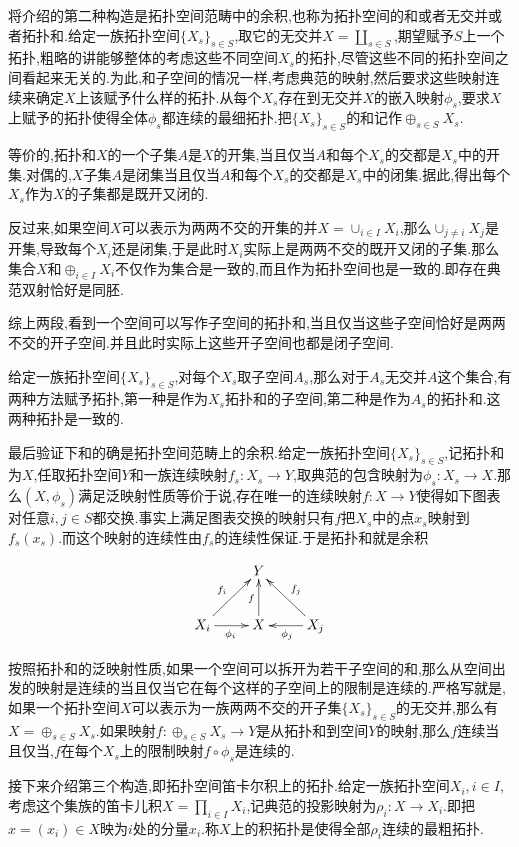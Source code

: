 将介绍的第二种构造是拓扑空间范畴中的余积,也称为拓扑空间的和或者无交并或者拓扑和.给定一族拓扑空间$\{X_s\}_{s\in S}$,取它的无交并$X=\coprod_{s\in S}$,期望赋予$S$上一个拓扑,粗略的讲能够整体的考虑这些不同空间$X_s$的拓扑,尽管这些不同的拓扑空间之间看起来无关的.为此,和子空间的情况一样,考虑典范的映射,然后要求这些映射连续来确定$X$上该赋予什么样的拓扑.从每个$X_s$存在到无交并$X$的嵌入映射$\phi_s$,要求$X$上赋予的拓扑使得全体$\phi_s$都连续的最细拓扑.把$\{X_s\}_{s\in S}$的和记作$\oplus_{s\in S}X_s$.

等价的,拓扑和$X$的一个子集$A$是$X$的开集,当且仅当$A$和每个$X_s$的交都是$X_s$中的开集.对偶的,$X$子集$A$是闭集当且仅当$A$和每个$X_s$的交都是$X_s$中的闭集.据此,得出每个$X_s$作为$X$的子集都是既开又闭的.

反过来,如果空间$X$可以表示为两两不交的开集的并$X=\cup_{i\in I}X_i$,那么$\cup_{j\not=i}X_j$是开集,导致每个$X_i$还是闭集,于是此时$X_i$实际上是两两不交的既开又闭的子集.那么集合$X$和$\oplus_{i\in I}X_i$不仅作为集合是一致的,而且作为拓扑空间也是一致的.即存在典范双射恰好是同胚.

综上两段,看到一个空间可以写作子空间的拓扑和,当且仅当这些子空间恰好是两两不交的开子空间.并且此时实际上这些开子空间也都是闭子空间.

给定一族拓扑空间$\{X_s\}_{s\in S}$,对每个$X_s$取子空间$A_s$,那么对于$A_s$无交并$A$这个集合,有两种方法赋予拓扑,第一种是作为$X_s$拓扑和的子空间,第二种是作为$A_s$的拓扑和.这两种拓扑是一致的.

最后验证下和的确是拓扑空间范畴上的余积.给定一族拓扑空间$\{X_s\}_{s\in S}$,记拓扑和为$X$,任取拓扑空间$Y$和一族连续映射$f_s:X_s\to Y$,取典范的包含映射为$\phi_s:X_s\to X$.那么$(X,\phi_s)$满足泛映射性质等价于说,存在唯一的连续映射$f:X\to Y$使得如下图表对任意$i,j\in S$都交换.事实上满足图表交换的映射只有$f$把$X_s$中的点$x_s$映射到$f_s(x_s)$.而这个映射的连续性由$f_s$的连续性保证.于是拓扑和就是余积

$$\xymatrix{
	&Y&\\
	X_i\ar[r]_{\phi_i}\ar[ur]^{f_i}&X\ar[u]^f&X_j\ar[l]^{\phi_j}\ar[ul]_{f_j}
}$$

按照拓扑和的泛映射性质,如果一个空间可以拆开为若干子空间的和,那么从空间出发的映射是连续的当且仅当它在每个这样的子空间上的限制是连续的.严格写就是,如果一个拓扑空间$X$可以表示为一族两两不交的开子集$\{X_s\}_{s\in S}$的无交并,那么有$X=\oplus_{s\in S}X_s$.如果映射$f:\oplus_{s\in S}X_s\to Y$是从拓扑和到空间$Y$的映射,那么$f$连续当且仅当,$f$在每个$X_s$上的限制映射$f\circ\phi_s$是连续的.

接下来介绍第三个构造,即拓扑空间笛卡尔积上的拓扑.给定一族拓扑空间$X_i,i\in I$,考虑这个集族的笛卡儿积$X=\prod_{i\in I}X_i$,记典范的投影映射为$\rho_i:X\to X_i$.即把$x=(x_i)\in X$映为$i$处的分量$x_i$.称$X$上的积拓扑是使得全部$\rho_i$连续的最粗拓扑.

